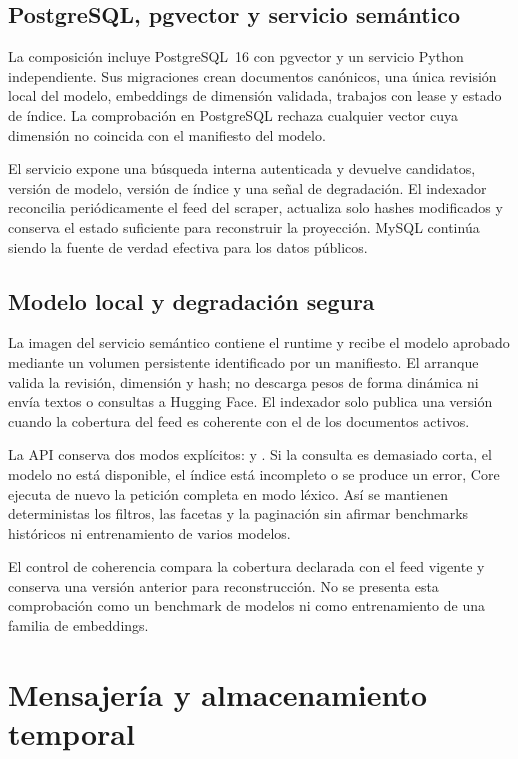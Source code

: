 \subsection{PostgreSQL, pgvector y servicio semántico}

La composición incluye PostgreSQL~16 con pgvector y un servicio Python independiente. Sus migraciones crean documentos canónicos, una única revisión local del modelo, embeddings de dimensión validada, trabajos con lease y estado de índice. La comprobación en PostgreSQL rechaza cualquier vector cuya dimensión no coincida con el manifiesto del modelo.

El servicio expone una búsqueda interna autenticada y devuelve candidatos, versión de modelo, versión de índice y una señal de degradación. El indexador reconcilia periódicamente el feed del scraper, actualiza solo hashes modificados y conserva el estado suficiente para reconstruir la proyección. MySQL continúa siendo la fuente de verdad efectiva para los datos públicos.

\subsection{Modelo local y degradación segura}

La imagen del servicio semántico contiene el runtime y recibe el modelo aprobado mediante un volumen persistente identificado por un manifiesto. El arranque valida la revisión, dimensión y hash; no descarga pesos de forma dinámica ni envía textos o consultas a Hugging Face. El indexador solo publica una versión cuando la cobertura del feed es coherente con el  de los documentos activos.

La API conserva dos modos explícitos:  y . Si la consulta es demasiado corta, el modelo no está disponible, el índice está incompleto o se produce un error, Core ejecuta de nuevo la petición completa en modo léxico. Así se mantienen deterministas los filtros, las facetas y la paginación sin afirmar benchmarks históricos ni entrenamiento de varios modelos.

El control de coherencia compara la cobertura declarada con el feed vigente y conserva una versión anterior para reconstrucción. No se presenta esta comprobación como un benchmark de modelos ni como entrenamiento de una familia de embeddings.

\section{Mensajería y almacenamiento temporal}

